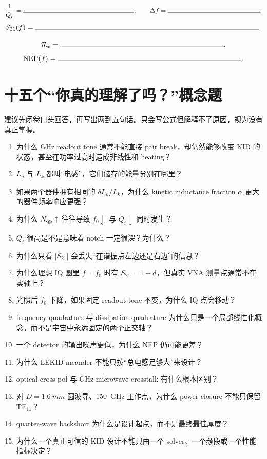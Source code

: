\documentclass[11pt,a4paper,openany]{ctexrep}
\begin{document}
\begin{notebookbox}[title=公式阶梯 D：从 $Q$ 到 $S_{21}$]
\[
\frac{1}{Q_r}=\rule{6cm}{0.4pt},
\qquad
\Delta f=\rule{5cm}{0.4pt},
\]
\[
S_{21}(f)=\rule{11cm}{0.4pt}.
\]
\end{notebookbox}

\begin{notebookbox}[title=公式阶梯 E：从输出噪声到 NEP]
\[
\mathcal R_x=\rule{8cm}{0.4pt},
\]
\[
\mathrm{NEP}(f)=\rule{9cm}{0.4pt}.
\]
\end{notebookbox}

\section{十五个“你真的理解了吗？”概念题}

\begin{checkpointbox}
建议先闭卷口头回答，再写出两到五句话。只会写公式但解释不了原因，视为没有真正掌握。
\end{checkpointbox}

\begin{enumerate}[label=\textbf{Q\arabic*.}]
  \item 为什么 GHz readout tone 通常不能直接 pair break，却仍然能够改变 KID 的状态，甚至在功率过高时造成非线性和 heating？
  \item $L_g$ 与 $L_k$ 都叫“电感”，它们储存的能量分别在哪里？
  \item 如果两个器件拥有相同的 $\delta L_k/L_k$，为什么 kinetic inductance fraction $\alpha$ 更大的器件频率响应更强？
  \item 为什么 $N_{\rm qp}\uparrow$ 往往导致 $f_0\downarrow$ 与 $Q_i\downarrow$ 同时发生？
  \item $Q_i$ 很高是不是意味着 notch 一定很深？为什么？
  \item 为什么只看 $|S_{21}|$ 会丢失“在谐振点左边还是右边”的信息？
  \item 为什么理想 IQ 圆里 $f=f_0$ 时有 $S_{21}=1-d$，但真实 VNA 测量点通常不在实轴上？
  \item 光照后 $f_0$ 下降，如果固定 readout tone 不变，为什么 IQ 点会移动？
  \item frequency quadrature 与 dissipation quadrature 为什么只是一个局部线性化概念，而不是宇宙中永远固定的两个正交轴？
  \item 一个 detector 的输出噪声更低，为什么 NEP 仍可能更差？
  \item 为什么 LEKID meander 不能只按“总电感足够大”来设计？
  \item optical cross-pol 与 GHz microwave crosstalk 有什么根本区别？
  \item 对 $D=\SI{1.6}{mm}$ 圆波导、\SI{150}{GHz} 工作点，为什么 power closure 不能只保留 TE$_{11}$？
  \item quarter-wave backshort 为什么是设计起点，而不是最终最佳厚度？
  \item 为什么一个真正可信的 KID 设计不能只由一个 solver、一个频段或一个性能指标决定？
\end{enumerate}
\end{document}
